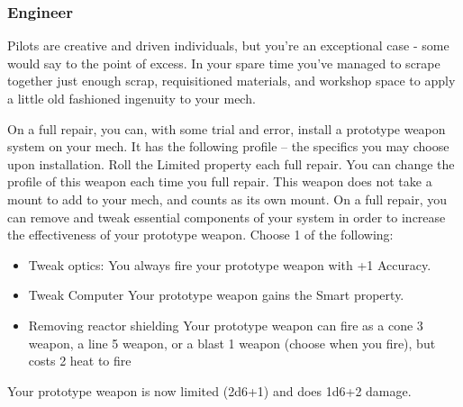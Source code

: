 \subsubsection{Engineer}

\begin{talent}
{Pilots are creative and driven individuals, but you’re an exceptional case - some would say to the point of excess. In your spare time you’ve managed to scrape together just enough scrap, requisitioned materials, and workshop space to apply a little old fashioned ingenuity to your mech.}

On a full repair, you can, with some trial and error, install a prototype weapon system on your mech. It has the following profile -- the specifics you may choose upon installation. Roll the Limited property each full repair. You can change the profile of this weapon each time you full repair. 
\gearBox
[name = {Prototype Weapon},
fluff = {},
template = {\Main (Choose 1; \Melee, \Rifle, \Cannon, \Launcher, \CQB)\newline
\Limited{1d6+2}, \Overcharged\newline
\Threat{1} (melee) or \Range{8} (ranged)\newline
1d6 \kinetic, \explosive or \energy damage}]
This weapon does not take a mount to add to your mech, and counts as its own mount.
On a full repair, you can remove and tweak essential components of your system in order to increase the effectiveness of your prototype weapon. 
Choose 1 of the following: 
\begin{itemize}
\item Tweak optics:
     You always fire your prototype weapon with +1 Accuracy. 
\item Tweak Computer 
     Your prototype weapon gains the Smart property. 
\item Removing reactor shielding 
     Your prototype weapon can fire as a cone 3 weapon, a line 5 weapon, or a blast 1 weapon (choose when you fire), but costs 2 heat to fire
\end{itemize}
Your prototype weapon is now limited (2d6+1) and does 1d6+2 damage.
\end{talent}
